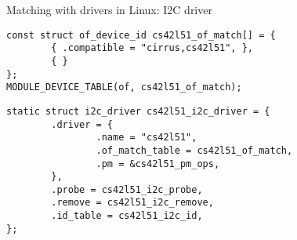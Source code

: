 \begin{frame}[fragile]{Matching with drivers in Linux: I2C driver}
  \begin{block}{}
    {\tiny
\begin{verbatim}
const struct of_device_id cs42l51_of_match[] = {
        { .compatible = "cirrus,cs42l51", },
        { }
};
MODULE_DEVICE_TABLE(of, cs42l51_of_match);
\end{verbatim}
    }
  \end{block}
  \begin{block}{}
    {\tiny
\begin{verbatim}
static struct i2c_driver cs42l51_i2c_driver = {
        .driver = {
                .name = "cs42l51",
                .of_match_table = cs42l51_of_match,
                .pm = &cs42l51_pm_ops,
        },
        .probe = cs42l51_i2c_probe,
        .remove = cs42l51_i2c_remove,
        .id_table = cs42l51_i2c_id,
};
\end{verbatim}
    }
  \end{block}
\end{frame}

